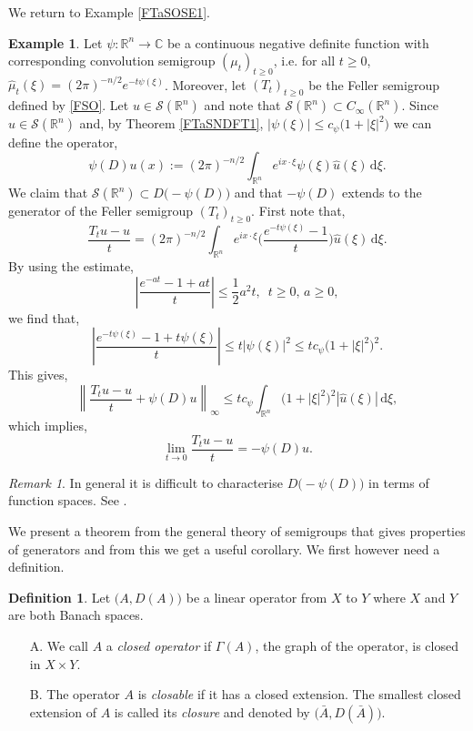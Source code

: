 \documentclass[a4paper, 12pt]{report}
\theoremstyle{cor}
\theoremstyle{remark}
\newtheorem{remark}[theorem]{Remark}
\theoremstyle{definition}
\newtheorem{defn}[theorem]{Definition}
\newtheorem{eg}[theorem]{Example}
\begin{document}
We return to Example \ref{FTaSOSE1}.
\begin{eg}\label{FTaSOSE2}
Let $\psi : \mathbb{R}^n \to \mathbb{C}$ be a continuous negative definite function with corresponding convolution semigroup $(\mu_t)_{t \ge 0}$, i.e. for all $t \ge 0$, $\hat{\mu}_t(\xi) = (2\pi)^{-n/2}e^{-t\psi(\xi)}$.  Moreover, let $(T_t)_{t \ge 0}$ be the Feller semigroup defined by \eqref{FSO}.  Let $u \in \mathcal{S}(\mathbb{R}^n)$ and note that $\mathcal{S}(\mathbb{R}^n) \subset C_\infty(\mathbb{R}^n)$.  Since $\hat{u} \in \mathcal{S}(\mathbb{R}^n)$ and, by Theorem \ref{FTaSNDFT1}, $|\psi(\xi)| \le c_\psi\big(1 + |\xi|^2\big)$ we can define the operator,
\begin{equation}\label{PDOwNDSeg}
\psi(D)u(x) := (2\pi)^{-n/2}\int_{\mathbb{R}^n}e^{ix\cdot\xi}\psi(\xi)\hat{u}(\xi)\,\mathrm{d}\xi.
\end{equation}
We claim that $\mathcal{S}(\mathbb{R}^n) \subset D\big(-\psi(D)\big)$ and that $-\psi(D)$ extends to the generator of the Feller semigroup $(T_t)_{t \ge 0}$.  First note that,
$$
\frac{T_tu - u}{t} = (2\pi)^{-n/2}\int_{\mathbb{R}^n}e^{ix\cdot\xi}\Big(\frac{e^{-t\psi(\xi)} - 1}{t}\Big)\hat{u}(\xi)\,\mathrm{d}\xi.
$$
By using the estimate,
$$
\left|\frac{e^{-at} - 1 + at}{t}\right| \le \frac{1}{2}a^2t, \,\,\, t \ge 0, \, a \ge 0,
$$
we find that,
$$
\left|\frac{e^{-t\psi(\xi)} - 1 + t\psi(\xi)}{t}\right| \le t|\psi(\xi)|^2 \le tc_\psi\big(1 + |\xi|^2\big)^2.
$$
This gives,
$$
\left\|\frac{T_tu - u}{t} + \psi(D)u\right\|_\infty \le tc_\psi\int_{\mathbb{R}^n}\big(1 + |\xi|^2\big)^2|\hat{u}(\xi)|\,\mathrm{d}\xi,
$$
which implies,
$$
\lim_{t \to 0}\frac{T_tu - u}{t} = -\psi(D)u.
$$
\end{eg}
\begin{remark}
In general it is difficult to characterise $D\big(-\psi(D)\big)$ in terms of function spaces.  See \cite{Vol1}.
\end{remark}

We present a theorem from the general theory of semigroups that gives properties of generators and from this we get a useful corollary.  We first however need a definition.
\begin{defn}
Let $\big(A, D(A)\big)$ be a linear operator from $X$ to $Y$ where $X$ and $Y$ are both Banach spaces.
\begin{itemize}
\item[A.] We call $A$ a \emph{closed operator} if $\Gamma(A)$, the graph of the operator, is closed in $X \times Y$.

\item[B.] The operator $A$ is \emph{closable} if it has a closed extension.  The smallest closed extension of $A$ is called its \emph{closure} and denoted by $\big(\bar{A}, D(\bar{A})\big)$.
\end{itemize}
\end{defn}
\end{document}
